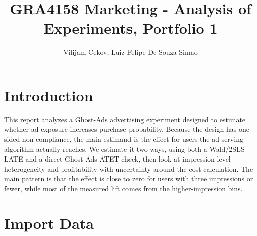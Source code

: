 \documentclass[
  letterpaper,
  DIV=11,
  numbers=noendperiod]{scrartcl}
\title{GRA4158 Marketing - Analysis of Experiments, Portfolio 1}
\author{Vilijam Cekov, Luiz Felipe De Souza Simao}
\date{}
\newenvironment{Shaded}{\begin{snugshade}}{\end{snugshade}}
\newcommand{\AttributeTok}[1]{\textcolor[rgb]{0.40,0.45,0.13}{#1}}
\newcommand{\CommentTok}[1]{\textcolor[rgb]{0.37,0.37,0.37}{#1}}
\newcommand{\ConstantTok}[1]{\textcolor[rgb]{0.56,0.35,0.01}{#1}}
\newcommand{\DecValTok}[1]{\textcolor[rgb]{0.68,0.00,0.00}{#1}}
\newcommand{\FunctionTok}[1]{\textcolor[rgb]{0.28,0.35,0.67}{#1}}
\newcommand{\NormalTok}[1]{\textcolor[rgb]{0.00,0.23,0.31}{#1}}
\newcommand{\OtherTok}[1]{\textcolor[rgb]{0.00,0.23,0.31}{#1}}
\newcommand{\SpecialCharTok}[1]{\textcolor[rgb]{0.37,0.37,0.37}{#1}}
\newcommand{\StringTok}[1]{\textcolor[rgb]{0.13,0.47,0.30}{#1}}
\renewcommand*\contentsname{Table of contents}
\newcommand\contentsname{Table of contents}
\begin{document}
\maketitle

\renewcommand*\contentsname{Table of contents}
{
\hypersetup{linkcolor=}
\setcounter{tocdepth}{3}
\tableofcontents
}

\section{Introduction}\label{introduction}

This report analyzes a Ghost-Ads advertising experiment designed to
estimate whether ad exposure increases purchase probability. Because the
design has one-sided non-compliance, the main estimand is the effect for
users the ad-serving algorithm actually reaches. We estimate it two
ways, using both a Wald/2SLS LATE and a direct Ghost-Ads ATET check,
then look at impression-level heterogeneity and profitability with
uncertainty around the cost calculation. The main pattern is that the
effect is close to zero for users with three impressions or fewer, while
most of the measured lift comes from the higher-impression bins.

\section{Import Data}\label{import-data}

\begin{Shaded}
\end{Shaded}
\end{document}
